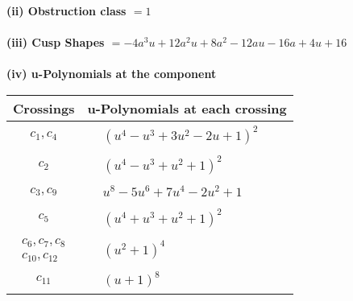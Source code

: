 \documentclass[1p]{elsarticle_modified}
\theoremstyle{definition}
\begin{document}
\flushleft \textbf{(ii) Obstruction class $= 1$}\\~\\
\flushleft \textbf{(iii) Cusp Shapes $= -4 a^3 u+12 a^2 u+8 a^2-12 a u-16 a+4 u+16$}\\~\\
\newpage\renewcommand{\arraystretch}{1}
\flushleft \textbf{(iv) u-Polynomials at the component}\newline \\
\begin{tabular}{m{50pt}|m{274pt}}
Crossings & \hspace{64pt}u-Polynomials at each crossing \\
\hline $$\begin{aligned}c_{1},c_{4}\end{aligned}$$&$\begin{aligned}
&(u^4- u^3+3 u^2-2 u+1)^2
\end{aligned}$\\
\hline $$\begin{aligned}c_{2}\end{aligned}$$&$\begin{aligned}
&(u^4- u^3+u^2+1)^2
\end{aligned}$\\
\hline $$\begin{aligned}c_{3},c_{9}\end{aligned}$$&$\begin{aligned}
&u^8-5 u^6+7 u^4-2 u^2+1
\end{aligned}$\\
\hline $$\begin{aligned}c_{5}\end{aligned}$$&$\begin{aligned}
&(u^4+u^3+u^2+1)^2
\end{aligned}$\\
\hline $$\begin{aligned}c_{6},c_{7},c_{8}\\c_{10},c_{12}\end{aligned}$$&$\begin{aligned}
&(u^2+1)^4
\end{aligned}$\\
\hline $$\begin{aligned}c_{11}\end{aligned}$$&$\begin{aligned}
&(u+1)^8
\end{aligned}$\\
\hline
\end{tabular}\\~\\
\end{document}
